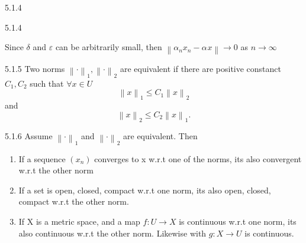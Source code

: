 \documentclass[a4paper,norsk]{article}
\renewcommand{\leq}{\leqslant}
\renewcommand{\epsilon}{\varepsilon}
\begin{document}
\begin{propositionbox}{5.1.4}{}
\begin{proofbox}{5.1.4}{}
\begin{itemize}
        Since $ \delta  $ and $ \epsilon  $ can be arbitrarily small, then $ \left\lVert \alpha_{n}^{} x_n - \alpha_{}^{} x  \right\rVert \to 0 $ as $ n \to \infty $ 
        
        
        
    \end{itemize}
\end{proofbox}
\end{propositionbox}


\begin{definitionbox}{5.1.5}{}
Two norms $ \left\lVert \cdot \right\rVert _1, \left\lVert \cdot \right\rVert _2 $ are equivalent if there are positive constanct $ C_1, C_2 $ such that $ \forall x \in U $ 
\[
    \left\lVert x \right\rVert_1 \leq C_1 \left\lVert x \right\rVert _2
\]
and 
\[
    \left\lVert x \right\rVert _2 \leq C_2 \left\lVert x \right\rVert _1.
\]
\end{definitionbox}

\begin{propositionbox}{5.1.6}{}
Assume $ \left\lVert \cdot \right\rVert _1 $ and $ \left\lVert \cdot \right\rVert _2 $ are equivalent. Then
\begin{enumerate}
  \item If a sequence $ \left( x_n \right)  $ converges to x w.r.t one of the norms, its also convergent w.r.t the other norm
  \item If a set is open, closed, compact w.r.t one norm, its also open, closed, compact w.r.t the other norm.
  \item If X is a metric space, and a map $ f: U \to X $ is continuous w.r.t one norm, its also continuous w.r.t the other norm. Likewise with $ g : X \to U $ is continuous.
\end{enumerate}
\end{propositionbox}
\end{document}
